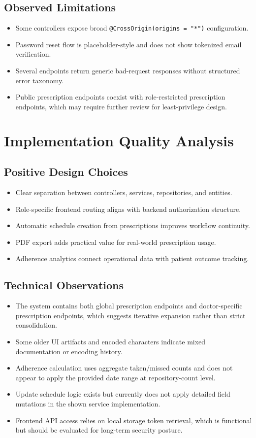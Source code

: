 \documentclass[12pt,a4paper]{article}
\begin{document}
\subsection{Observed Limitations}
\begin{itemize}[leftmargin=*]
  \item Some controllers expose broad \texttt{@CrossOrigin(origins = "*")} configuration.
  \item Password reset flow is placeholder-style and does not show tokenized email verification.
  \item Several endpoints return generic bad-request responses without structured error taxonomy.
  \item Public prescription endpoints coexist with role-restricted prescription endpoints, which may require further review for least-privilege design.
\end{itemize}

\section{Implementation Quality Analysis}
\subsection{Positive Design Choices}
\begin{itemize}[leftmargin=*]
  \item Clear separation between controllers, services, repositories, and entities.
  \item Role-specific frontend routing aligns with backend authorization structure.
  \item Automatic schedule creation from prescriptions improves workflow continuity.
  \item PDF export adds practical value for real-world prescription usage.
  \item Adherence analytics connect operational data with patient outcome tracking.
\end{itemize}

\subsection{Technical Observations}
\begin{itemize}[leftmargin=*]
  \item The system contains both global prescription endpoints and doctor-specific prescription endpoints, which suggests iterative expansion rather than strict consolidation.
  \item Some older UI artifacts and encoded characters indicate mixed documentation or encoding history.
  \item Adherence calculation uses aggregate taken/missed counts and does not appear to apply the provided date range at repository-count level.
  \item Update schedule logic exists but currently does not apply detailed field mutations in the shown service implementation.
  \item Frontend API access relies on local storage token retrieval, which is functional but should be evaluated for long-term security posture.
\end{itemize}
\end{document}
